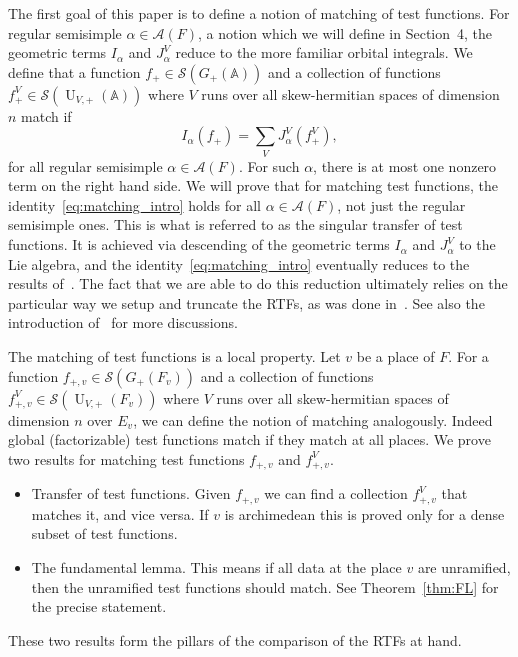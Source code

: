 \documentclass[letterpaper,11pt]{amsart}
\newcommand{\bA}{\mathbb{A}}
\newcommand{\cA}{\mathcal{A}}
\newcommand{\cS}{\mathcal{S}}
\newcommand{\<}{\negthickspace}
\DeclareMathOperator{\U}{U}
\theoremstyle{definition}
\theoremstyle{plain}
\theoremstyle{remark}
\numberwithin{equation}{section}
\begin{document}
The first goal of this paper is to define a notion of matching of test functions. For regular semisimple $\alpha \in \cA(F)$, a notion which we will define in Section~4, the geometric terms $I_{\alpha}$ and $J_{\alpha}^V$ reduce to the more familiar orbital integrals. We define that a function $f_+ \in \cS(G_+(\bA))$ and a collection of functions $f_+^V \in \cS(\U_{V, +}(\bA))$ where $V$ runs over all skew-hermitian spaces of dimension $n$ match if 
    \begin{equation}    \label{eq:matching_intro}
    I_{\alpha}(f_+) = \sum_V J_{\alpha}^V(f_+^V),
    \end{equation}
for all regular semisimple $\alpha \in \cA(F)$. For such $\alpha$, there is at most one nonzero term on the right hand side. We will prove that for matching test functions, the identity~\eqref{eq:matching_intro} holds for all $\alpha \in \cA(F)$, not just the regular semisimple ones. This is what is referred to as the singular transfer of test functions. It is achieved via descending of the geometric terms $I_{\alpha}$ and $J_{\alpha}^V$ to the Lie algebra, and the identity~\eqref{eq:matching_intro} eventually reduces to the results of~\cite{CZ}. The fact that we are able to do this reduction ultimately relies on the particular way we setup and truncate the RTFs, as was done in~\cite{BLX1}. See also the introduction of~\cite{BLX1} for more discussions.

The matching of test functions is a local property. Let $v$ be a place of $F$. For a function $f_{+, v} \in \cS(G_+(F_v))$ and a collection of functions $f_{+, v}^V \in \cS(\U_{V, +}(F_v))$ where $V$ runs over all skew-hermitian spaces of dimension $n$ over $E_v$, we can define the notion of matching analogously. Indeed global (factorizable) test functions match if they match at all places. We prove two results for matching test functions $f_{+, v}$ and $f_{+, v}^V$. 
\begin{itemize}
\item Transfer of test functions. Given $f_{+,v}$ we can find a collection $f_{+, v}^V$ that matches it, and vice versa. If $v$ is archimedean this is proved only for a dense subset of test functions. 

\item The fundamental lemma. This means if all data at the place $v$ are unramified, then the unramified test functions should match. See Theorem~\ref{thm:FL} for the precise statement.
\end{itemize}
These two results form the pillars of the comparison of the RTFs at hand.
    
\end{document}
